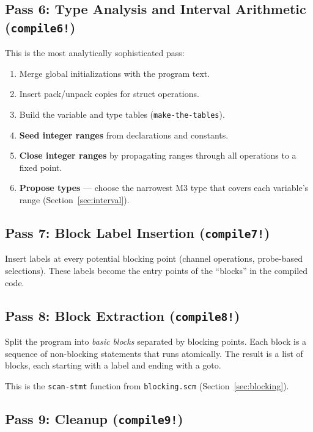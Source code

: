 \documentclass[11pt,letterpaper]{article}
\begin{document}
\subsection{Pass 6: Type Analysis and Interval Arithmetic (\texttt{compile6!})}

This is the most analytically sophisticated pass:

\begin{enumerate}[nosep]
  \item Merge global initializations with the program text.
  \item Insert pack/unpack copies for struct operations.
  \item Build the variable and type tables (\texttt{make-the-tables}).
  \item \textbf{Seed integer ranges} from declarations and constants.
  \item \textbf{Close integer ranges} by propagating ranges through
    all operations to a fixed point.
  \item \textbf{Propose types} --- choose the narrowest M3 type that
    covers each variable's range (Section~\ref{sec:interval}).
\end{enumerate}

\subsection{Pass 7: Block Label Insertion (\texttt{compile7!})}

Insert labels at every potential blocking point (channel operations,
probe-based selections).  These labels become the entry points of
the ``blocks'' in the compiled code.

\subsection{Pass 8: Block Extraction (\texttt{compile8!})}

Split the program into \emph{basic blocks} separated by blocking
points.  Each block is a sequence of non-blocking statements that
runs atomically.  The result is a list of blocks, each starting with
a label and ending with a goto.

This is the \texttt{scan-stmt} function from \texttt{blocking.scm}
(Section~\ref{sec:blocking}).

\subsection{Pass 9: Cleanup (\texttt{compile9!})}
\end{document}
